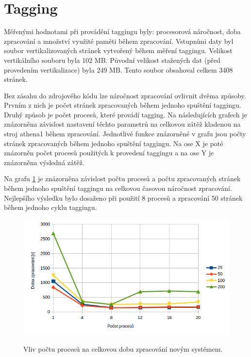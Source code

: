 \section{Tagging}
Měřenými hodnotami při provádění taggingu byly: procesorová náročnost, doba zpracování
a množství využité paměti během zpracování. Vstupními daty byl soubor vertikalizovaných stránek
vytvořený během měření taggingu. Velikost vertikálního souboru byla 102 MB. Původní velikost
stažených dat (před provedením vertikalizace) byla 249 MB. Tento soubor obsahoval celkem
3408 stránek.

Bez zásahu do zdrojového kódu lze náročnost zpracování ovlivnit dvěma způsoby.
Prvním z nich je počet stránek zpracovaných během jednoho spuštění taggingu. Druhý způsob
je počet procesů, které provádí tagging. Na následujících grafech je znázorněna závislost
nastavení těchto parametrů na celkovou zátěž kladenou na stroj athena1 během zpracování.
Jednotlivé funkce znázorněné v grafu jsou počty stránek zpracovaných během jednoho spuštění
taggingu. Na ose X je poté znázorněn počet procesů použitých k provedení taggingu a na
ose Y je znázorněna výsledná zátěž.

Na grafu \ref{graph:graph_tagging_doba_zpracovani} je znázorněna závislost počtu procesů
a počtu zpracovaných stránek během jednoho spuštění taggingu na celkovou časovou náročnost
zpracování. Nejlepšího výsledku bylo dosaženo při použití 8 procesů a zpracování 50
stránek během jednoho cyklu taggingu.

\begin{figure}[H]
    \begin{center}
        \label{graph:graph_tagging_doba_zpracovani}
        \includegraphics[width=1.0\textwidth]{obrazky-figures/graph_tagging_doba_zpracovani.png}
        \caption{Vliv počtu procesů na celkovou dobu zpracování novým systémem.}
    \end{center}
\end{figure}

